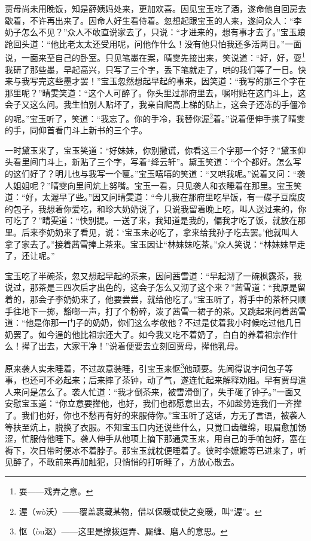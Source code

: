 \par 贾母尚未用晚饭，知是薛姨妈处来，更加欢喜。因见宝玉吃了酒，遂命他自回房去歇着，不许再出来了。因命人好生看侍着。忽想起跟宝玉的人来，遂问众人：“李奶子怎么不见？”众人不敢直说家去了，只说：“才进来的，想有事才去了。”宝玉踉跄回头道：“他比老太太还受用呢，问他作什么！没有他只怕我还多活两日。”一面说，一面来至自己的卧室。只见笔墨在案，晴雯先接出来，笑说道：“好，好，耍\footnote{耍——戏弄之意。}我研了那些墨，早起高兴，只写了三个字，丢下笔就走了，哄的我们等了一日。快来与我写完这些墨才罢！”宝玉忽然想起早起的事来，因笑道：“我写的那三个字在那里呢？”晴雯笑道：“这个人可醉了。你头里过那府里去，嘱咐贴在这门斗上，这会子又这么问。我生怕别人贴坏了，我亲自爬高上梯的贴上，这会子还冻的手僵冷的呢。”宝玉听了，笑道：“我忘了。你的手冷，我替你渥\footnote{渥（wò沃）——覆盖裹藏某物，借以保暖或使之变暖，叫“渥”。}着。”说着便伸手携了晴雯的手，同仰首看门斗上新书的三个字。
\par 一时黛玉来了，宝玉笑道：“好妹妹，你别撒谎，你看这三个字那一个好？”黛玉仰头看里间门斗上，新贴了三个字，写着“绛云轩”。黛玉笑道：“个个都好。怎么写的这们好了？明儿也与我写一个匾。”宝玉嘻嘻的笑道：“又哄我呢。”说着又问：“袭人姐姐呢？”晴雯向里间炕上努嘴。宝玉一看，只见袭人和衣睡着在那里。宝玉笑道：“好，太渥早了些。”因又问晴雯道：“今儿我在那府里吃早饭，有一碟子豆腐皮的包子，我想着你爱吃，和珍大奶奶说了，只说我留着晚上吃，叫人送过来的，你可吃了？”晴雯道：“快别提。一送了来，我知道是我的，偏我才吃了饭，就放在那里。后来李奶奶来了看见，说：‘宝玉未必吃了，拿来给我孙子吃去罢。’他就叫人拿了家去了。”接着茜雪捧上茶来。宝玉因让“林妹妹吃茶。”众人笑说：“林妹妹早走了，还让呢。”
\par 宝玉吃了半碗茶，忽又想起早起的茶来，因问茜雪道：“早起沏了一碗枫露茶，我说过，那茶是三四次后才出色的，这会子怎么又沏了这个来？”茜雪道：“我原是留着的，那会子李奶奶来了，他要尝尝，就给他吃了。”宝玉听了，将手中的茶杯只顺手往地下一掷，豁啷一声，打了个粉碎，泼了茜雪一裙子的茶。又跳起来问着茜雪道：“他是你那一门子的奶奶，你们这么孝敬他？不过是仗着我小时候吃过他几日奶罢了。如今逞的他比祖宗还大了。如今我又吃不着奶了，白白的养着祖宗作什么！撵了出去，大家干净！”说着便要去立刻回贾母，撵他乳母。
\par 原来袭人实未睡着，不过故意装睡，引宝玉来怄\footnote{怄（òu沤）——这里是撩拨逗弄、厮缠、磨人的意思。}他顽耍。先闻得说字问包子等事，也还可不必起来；后来摔了茶钟，动了气，遂连忙起来解释劝阻。早有贾母遣人来问是怎么了。袭人忙道：“我才倒茶来，被雪滑倒了，失手砸了钟子。”一面又安慰宝玉道：“你立意要撵他，也好，我们也都愿意出去，不如趁势连我们一齐撵了。我们也好，你也不愁再有好的来服侍你。”宝玉听了这话，方无了言语，被袭人等扶至炕上，脱换了衣服。不知宝玉口内还说些什么，只觉口齿缠绵，眼眉愈加饧涩，忙服侍他睡下。袭人伸手从他项上摘下那通灵玉来，用自己的手帕包好，塞在褥下，次日带时便冰不着脖子。那宝玉就枕便睡着了。彼时李嬷嬷等已进来了，听见醉了，不敢前来再加触犯，只悄悄的打听睡了，方放心散去。
